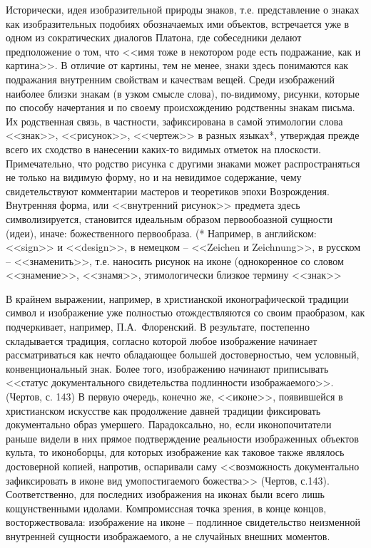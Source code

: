 Исторически, идея изобразительной природы знаков, т.е. представление о знаках
как изобразительных подобиях обозначаемых ими объектов, встречается уже в
одном из сократических диалогов Платона, где собеседники делают предположение о
том, что <<имя тоже в некотором роде есть подражание, как и картина>>.\autocite{kratil2013} В
отличие от картины, тем  не менее, знаки здесь понимаются как подражания внутренним свойствам и
качествам вещей. Среди изображений наиболее близки знакам (в узком смысле слова), по-видимому,
рисунки, которые по способу начертания и по своему происхождению родственны знакам письма. Их
родственная связь, в частности, зафиксирована в самой этимологии слова <<знак>>, <<рисунок>>,
<<чертеж>> в разных языках*, утверждая прежде всего их сходство в нанесении каких-то видимых отметок на
плоскости. Примечательно, что родство рисунка с другими знаками может распространяться не только на
видимую форму, но и на невидимое содержание, чему свидетельствуют комментарии мастеров и теоретиков
эпохи Возрождения.\autocite[][527-535]{zukarro1981} Внутренняя форма, или <<внутренний
рисунок>> предмета здесь символизируется, становится идеальным образом первообоазной сущности (идеи),
иначе: божественного первообраза. (* Например, в английском: <<sign>> и <<design>>, в немецком –
<<Zeichen и Zeichnung>>,  в русском – <<знаменить>>, т.е. наносить рисунок на иконе (однокоренное со
словом <<знамение>>, <<знамя>>, этимологически близкое термину <<знак>> \autocite[][140]{chertov1993}

В крайнем выражении, например, в христианской иконографической традиции
символ и изображение уже полностью отождествляются со своим праобразом,
как подчеркивает, например, П.А.~Флоренский.\autocite{florensky1995}
В результате, постепенно складывается традиция, согласно которой любое
изображение начинает рассматриваться как нечто обладающее большей достоверностью,
чем условный, конвенциональный знак. Более того, изображению начинают
приписывать <<статус документального свидетельства подлинности изображаемого>>.
(Чертов, с. 143) В первую очередь, конечно же, <<иконе>>, появившейся в
христианском искусстве как продолжение давней традиции фиксировать документально
образ умершего. \autocite{lihachev1971}
Парадоксально, но, если иконопочитатели раньше видели в них прямое подтверждение
реальности изображенных объектов культа, то иконоборцы, для которых изображение
как таковое также являлось достоверной копией, напротив,  оспаривали саму
<<возможность документально зафиксировать в иконе вид умопостигаемого божества>>
(Чертов, с.143). Соответственно, для последних изображения на иконах были
всего лишь кощунственными идолами. Компромиссная точка зрения, в конце
концов, восторжествовала: изображение на иконе -- подлинное свидетельство
неизменной внутренней сущности изображаемого, а не случайных внешних
моментов.\autocite[][18]{lasarev1986, bichkov1989}

